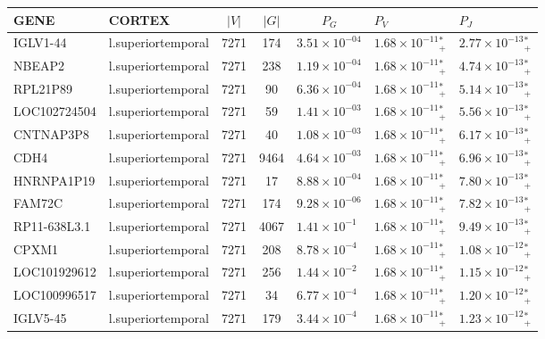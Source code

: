 \begin{tabular}{llcclll}
  \hline
  GENE & CORTEX & $|V|$ & $|G|$ & $\qquad P_G$ & \qquad $P_V$ & \qquad $P_J$ \\ 
  \hline
  IGLV1-44 & l.superiortemporal & 7271 &  174 & $3.51 \times {10^{-04}}$ & $1.68 \times {10^{-11}}{_+^*}$ & $2.77 \times {10^{-13}}{_+^*}$ \\ 
  NBEAP2 & l.superiortemporal & 7271 &  238 & $1.19 \times {10^{-04}}$ & $1.68 \times {10^{-11}}{_+^*}$ & $4.74 \times {10^{-13}}{_+^*}$ \\ 
  RPL21P89 & l.superiortemporal & 7271 &   90 & $6.36 \times {10^{-04}}$ & $1.68 \times {10^{-11}}{_+^*}$ & $5.14 \times {10^{-13}}{_+^*}$ \\ 
  LOC102724504 & l.superiortemporal & 7271 &   59 & $1.41 \times {10^{-03}}$ & $1.68 \times {10^{-11}}{_+^*}$ & $5.56 \times {10^{-13}}{_+^*}$ \\ 
  CNTNAP3P8 & l.superiortemporal & 7271 &   40 & $1.08 \times {10^{-03}}$ & $1.68 \times {10^{-11}}{_+^*}$ & $6.17 \times {10^{-13}}{_+^*}$ \\ 
  CDH4 & l.superiortemporal & 7271 & 9464 & $4.64 \times {10^{-03}}$ & $1.68 \times {10^{-11}}{_+^*}$ & $6.96 \times {10^{-13}}{_+^*}$ \\ 
  HNRNPA1P19 & l.superiortemporal & 7271 &   17 & $8.88 \times {10^{-04}}$ & $1.68 \times {10^{-11}}{_+^*}$ & $7.80 \times {10^{-13}}{_+^*}$ \\ 
  FAM72C & l.superiortemporal & 7271 &  174 & $9.28 \times {10^{-06}}$ & $1.68 \times {10^{-11}}{_+^*}$ & $7.82 \times {10^{-13}}{_+^*}$ \\ 
  RP11-638L3.1 & l.superiortemporal & 7271 & 4067 & $1.41 \times {10^{-1}}$ & $1.68 \times {10^{-11}}{_+^*}$ & $9.49 \times {10^{-13}}{_+^*}$ \\ 
  CPXM1 & l.superiortemporal & 7271 &  208 & $8.78 \times {10^{-4}}$ & $1.68 \times {10^{-11}}{_+^*}$ & $1.08 \times {10^{-12}}{_+^*}$ \\ 
  LOC101929612 & l.superiortemporal & 7271 &  256 & $1.44 \times {10^{-2}}$ & $1.68 \times {10^{-11}}{_+^*}$ & $1.15 \times {10^{-12}}{_+^*}$ \\ 
  LOC100996517 & l.superiortemporal & 7271 &   34 & $6.77 \times {10^{-4}}$ & $1.68 \times {10^{-11}}{_+^*}$ & $1.20 \times {10^{-12}}{_+^*}$ \\ 
  IGLV5-45 & l.superiortemporal & 7271 &  179 & $3.44 \times {10^{-4}}$ & $1.68 \times {10^{-11}}{_+^*}$ & $1.23 \times {10^{-12}}{_+^*}$ \\ 

\end{tabular}
